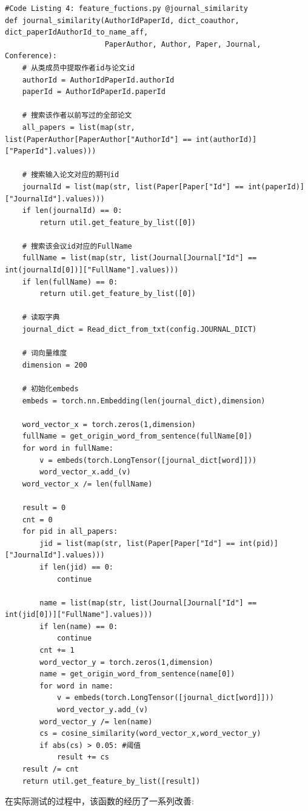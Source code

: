 \documentclass{mcmthesis}
\begin{document}
			{\setmainfont{Courier New Bold}              
				\begin{lstlisting}
#Code Listing 4: feature_fuctions.py @journal_similarity
def journal_similarity(AuthorIdPaperId, dict_coauthor, dict_paperIdAuthorId_to_name_aff, 
					   PaperAuthor, Author, Paper, Journal, Conference):
	# 从类成员中提取作者id与论文id
	authorId = AuthorIdPaperId.authorId
	paperId = AuthorIdPaperId.paperId
	
	# 搜索该作者以前写过的全部论文
	all_papers = list(map(str, list(PaperAuthor[PaperAuthor["AuthorId"] == int(authorId)]["PaperId"].values)))
	
	# 搜索输入论文对应的期刊id
	journalId = list(map(str, list(Paper[Paper["Id"] == int(paperId)]["JournalId"].values)))
	if len(journalId) == 0:
		return util.get_feature_by_list([0])
	
	# 搜索该会议id对应的FullName
	fullName = list(map(str, list(Journal[Journal["Id"] == int(journalId[0])]["FullName"].values)))
	if len(fullName) == 0:
		return util.get_feature_by_list([0])
	
	# 读取字典
	journal_dict = Read_dict_from_txt(config.JOURNAL_DICT)
	
	# 词向量维度
	dimension = 200

	# 初始化embeds
	embeds = torch.nn.Embedding(len(journal_dict),dimension)

	word_vector_x = torch.zeros(1,dimension)
	fullName = get_origin_word_from_sentence(fullName[0])
	for word in fullName:
		v = embeds(torch.LongTensor([journal_dict[word]]))
		word_vector_x.add_(v)
	word_vector_x /= len(fullName)

	result = 0
	cnt = 0
	for pid in all_papers:
		jid = list(map(str, list(Paper[Paper["Id"] == int(pid)]["JournalId"].values)))
		if len(jid) == 0:
			continue

		name = list(map(str, list(Journal[Journal["Id"] == int(jid[0])]["FullName"].values)))
		if len(name) == 0:
			continue
		cnt += 1
		word_vector_y = torch.zeros(1,dimension)
		name = get_origin_word_from_sentence(name[0])
		for word in name:
			v = embeds(torch.LongTensor([journal_dict[word]]))
			word_vector_y.add_(v)
		word_vector_y /= len(name)
		cs = cosine_similarity(word_vector_x,word_vector_y)
		if abs(cs) > 0.05: #阈值
			result += cs
	result /= cnt
	return util.get_feature_by_list([result])
				\end{lstlisting}
			}
			\par 在实际测试的过程中，该函数的经历了一系列改善:
\end{document}
